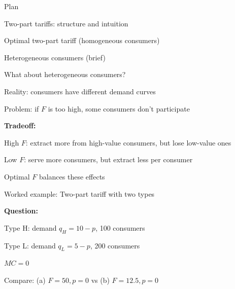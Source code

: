 \documentclass[notes,11pt, aspectratio=169]{beamer}
\newenvironment{wideitemize}{\itemize\addtolength{\itemsep}{10pt}}{\enditemize}
\newenvironment{wideenumerate}{\enumerate\addtolength{\itemsep}{10pt}}{\endenumerate}
\begin{document}
\begin{frame}{Plan}
  \begin{wideenumerate}
    \item Two-part tariffs: structure and intuition
    \item Optimal two-part tariff (homogeneous consumers)
    \item Heterogeneous consumers (brief)
  \end{wideenumerate}
\end{frame}

\begin{frame}{What about heterogeneous consumers?}
	\begin{wideitemize}
		\item Reality: consumers have different demand curves
		\item Problem: if $F$ is too high, some consumers don't participate
		\item \textbf{Tradeoff:}
		\begin{wideitemize}
			\vspace{5pt}
			\item High $F$: extract more from high-value consumers, but lose low-value ones
			\item Low $F$: serve more consumers, but extract less per consumer
		\end{wideitemize}
		\item Optimal $F$ balances these effects
	\end{wideitemize}
\end{frame}

\begin{frame}{Worked example: Two-part tariff with two types}
	\begin{wideitemize}
		\item \textbf{Question:}
		\item Type H: demand $q_H = 10 - p$, 100 consumers
		\item Type L: demand $q_L = 5 - p$, 200 consumers
		\item $MC = 0$
		\item Compare: (a) $F = 50, p = 0$ vs (b) $F = 12.5, p = 0$
	\end{wideitemize}
\end{frame}
\end{document}
